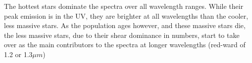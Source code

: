 \documentclass[11pt]{article}
\begin{document}
\begin{enumerate}
\begin{enumerate}
		The hottest stars dominate the spectra over all wavelength ranges. While their peak emission is in the UV, they are brighter at all wavelengths than the cooler, less massive stars. As the population ages however, and these massive stars die, the less massive stars, due to their shear dominance in numbers, start to take over as the main contributors to the spectra at longer wavelengths (red-ward of 1.2 or 1.3$\mu m$)\\
		
    
    \end{enumerate}
  
  
\end{enumerate}
\end{document}
